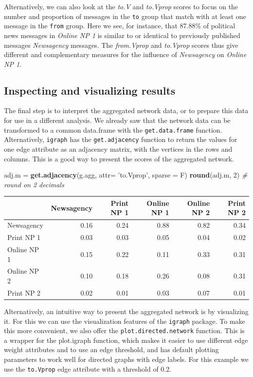 \documentclass[]{article}
\newenvironment{Shaded}{\begin{snugshade}}{\end{snugshade}}
\newcommand{\KeywordTok}[1]{\textcolor[rgb]{0.13,0.29,0.53}{\textbf{{#1}}}}
\newcommand{\DataTypeTok}[1]{\textcolor[rgb]{0.13,0.29,0.53}{{#1}}}
\newcommand{\DecValTok}[1]{\textcolor[rgb]{0.00,0.00,0.81}{{#1}}}
\newcommand{\StringTok}[1]{\textcolor[rgb]{0.31,0.60,0.02}{{#1}}}
\newcommand{\CommentTok}[1]{\textcolor[rgb]{0.56,0.35,0.01}{\textit{{#1}}}}
\newcommand{\NormalTok}[1]{{#1}}
\begin{document}
Alternatively, we can also look at the \emph{to.V} and \emph{to.Vprop}
scores to focus on the number and proportion of messages in the
\texttt{to} group that match with at least one message in the
\texttt{from} group. Here we see, for instance, that 87.88\% of
political news messages in \emph{Online NP 1} is similar to or identical
to previously published messages \emph{Newsagency} messages. The
\emph{from.Vprop} and \emph{to.Vprop} scores thus give different and
complementary measures for the influence of \emph{Newsagency} on
\emph{Online NP 1}.

\subsection{Inspecting and visualizing
results}\label{inspecting-and-visualizing-results}

The final step is to interpret the aggregated network data, or to
prepare this data for use in a different analysis. We already saw that
the network data can be transformed to a common data.frame with the
\texttt{get.data.frame} function. Alternatively, \texttt{igraph} has the
\texttt{get.adjacency} function to return the values for one edge
attribute as an adjacency matrix, with the vertices in the rows and
columns. This is a good way to present the scores of the aggregated
network.

\begin{Shaded}
\begin{Highlighting}[]
\NormalTok{adj.m =}\StringTok{ }\KeywordTok{get.adjacency}\NormalTok{(g.agg, }\DataTypeTok{attr=} \StringTok{'to.Vprop'}\NormalTok{, }\DataTypeTok{sparse =} \NormalTok{F)}
\KeywordTok{round}\NormalTok{(adj.m, }\DecValTok{2}\NormalTok{) }\CommentTok{# round on 2 decimals}
\end{Highlighting}
\end{Shaded}

\begin{longtable}[c]{@{}lrrrrr@{}}
\toprule
& Newsagency & Print NP 1 & Online NP 1 & Online NP 2 & Print NP
2\tabularnewline
\midrule
\endhead
Newsagency & 0.16 & 0.24 & 0.88 & 0.82 & 0.34\tabularnewline
Print NP 1 & 0.03 & 0.03 & 0.05 & 0.04 & 0.02\tabularnewline
Online NP 1 & 0.15 & 0.22 & 0.11 & 0.33 & 0.31\tabularnewline
Online NP 2 & 0.10 & 0.18 & 0.26 & 0.08 & 0.31\tabularnewline
Print NP 2 & 0.02 & 0.01 & 0.03 & 0.07 & 0.01\tabularnewline
\bottomrule
\end{longtable}

Alternatively, an intuitive way to present the aggregated network is by
visualizing it. For this we can use the visualization features of the
\texttt{igraph} package. To make this more convenient, we also offer the
\texttt{plot.directed.network} function. This is a wrapper for the
plot.igraph function, which makes it easier to use different edge weight
attributes and to use an edge threshold, and has default plotting
parameters to work well for directed graphs with edge labels. For this
example we use the \texttt{to.Vprop} edge attribute with a threshold of
0.2.
\end{document}

